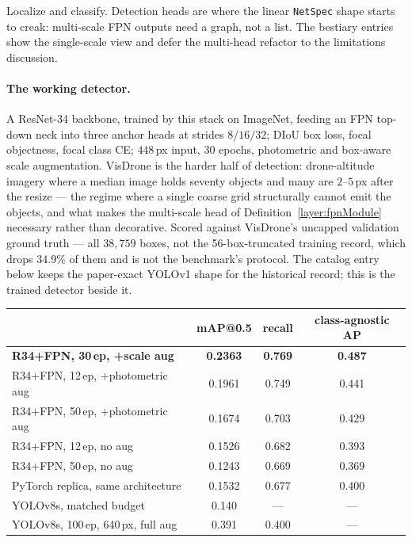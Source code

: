 Localize and classify. Detection heads are where the linear
\texttt{NetSpec} shape starts to creak: multi-scale FPN outputs need a
graph, not a list. The bestiary entries show the single-scale view and
defer the multi-head refactor to the limitations discussion.

\paragraph{The working detector.}
A ResNet-34 backbone, trained by this stack on ImageNet, feeding an FPN
top-down neck into three anchor heads at strides $8/16/32$; DIoU box loss,
focal objectness, focal class CE; $448$\,px input, 30 epochs, photometric
and box-aware scale augmentation. VisDrone is the harder half of detection:
drone-altitude imagery where a median image holds seventy objects and
many are $2$--$5$\,px after the resize --- the regime where a single coarse
grid structurally cannot emit the objects, and what makes the multi-scale head
of Definition~\ref{layer:fpnModule} necessary rather than decorative. Scored
against VisDrone's uncapped validation ground truth --- all $38{,}759$
boxes, not the 56-box-truncated training record, which drops $34.9\%$ of them
and is not the benchmark's protocol. The catalog entry below keeps the
paper-exact YOLOv1 shape for the historical record; this is the trained
detector beside it.

\begin{center}
\small
\begin{tabular}{l c c c}
\hline
 & mAP@0.5 & recall & class-agnostic AP \\
\hline
\textbf{R34+FPN, 30\,ep, +scale aug} & \textbf{0.2363} & \textbf{0.769} & \textbf{0.487} \\
R34+FPN, 12\,ep, +photometric aug & 0.1961 & 0.749 & 0.441 \\
R34+FPN, 50\,ep, +photometric aug & 0.1674 & 0.703 & 0.429 \\
R34+FPN, 12\,ep, no aug & 0.1526 & 0.682 & 0.393 \\
R34+FPN, 50\,ep, no aug & 0.1243 & 0.669 & 0.369 \\
PyTorch replica, same architecture & 0.1532 & 0.677 & 0.400 \\
YOLOv8s, matched budget & 0.140 & --- & --- \\
YOLOv8s, 100\,ep, 640\,px, full aug & 0.391 & 0.400 & --- \\
\hline
\end{tabular}
\end{center}

